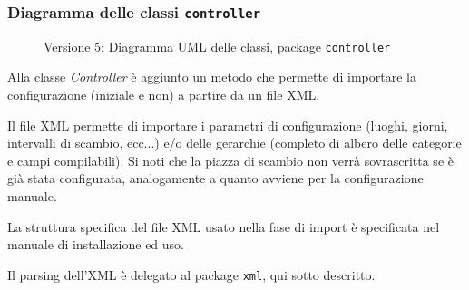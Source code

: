 \subsubsection{Diagramma delle classi \texttt{controller}}
\vspace{0.5cm}
\begin{figure}[H]
    \centering
    \caption{Versione 5: Diagramma UML delle classi, package \texttt{controller}}
    \label{fig:class_controller_v_5}
\end{figure}

Alla classe \textit{Controller} è aggiunto un metodo che permette di importare la configurazione (iniziale e non) a partire da un file XML.

Il file XML permette di importare i parametri di configurazione (luoghi, giorni, intervalli di scambio, ecc...) e/o delle gerarchie (completo di albero delle categorie e campi compilabili).
Si noti che la piazza di scambio non verrà sovrascritta se è già stata configurata, analogamente a quanto avviene per la configurazione manuale.

La struttura specifica del file XML usato nella fase di import è specificata nel manuale di installazione ed uso.

Il parsing dell'XML è delegato al package \texttt{xml}, qui sotto descritto.